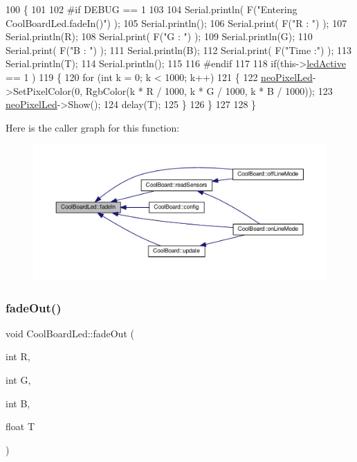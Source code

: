 \begin{DoxyCode}
100 \{
101 
102 \textcolor{preprocessor}{#if DEBUG == 1}
103 
104     Serial.println( F(\textcolor{stringliteral}{"Entering CoolBoardLed.fadeIn()"}) );
105     Serial.println();
106     Serial.print( F(\textcolor{stringliteral}{"R : "}) );
107     Serial.println(R);
108     Serial.print( F(\textcolor{stringliteral}{"G : "}) );
109     Serial.println(G);
110     Serial.print( F(\textcolor{stringliteral}{"B : "}) );
111     Serial.println(B);
112     Serial.print( F(\textcolor{stringliteral}{"Time :"}) );
113     Serial.println(T);
114     Serial.println();
115 
116 \textcolor{preprocessor}{#endif  }
117     
118     \textcolor{keywordflow}{if}(this->\hyperlink{class_cool_board_led_aadd04d2ecf123247718d77f42fba7f08}{ledActive} == 1 )
119     \{
120         \textcolor{keywordflow}{for} (\textcolor{keywordtype}{int} k = 0; k < 1000; k++) 
121         \{
122             \hyperlink{class_cool_board_led_ac2c13fa462a010cd9242bf297c013923}{neoPixelLed}->SetPixelColor(0, RgbColor(k * R / 1000, k * G / 1000, k * B / 1000));
123             \hyperlink{class_cool_board_led_ac2c13fa462a010cd9242bf297c013923}{neoPixelLed}->Show();
124             delay(T);
125         \}
126     \}
127 
128 \}
\end{DoxyCode}
Here is the caller graph for this function\+:\nopagebreak
\begin{figure}[H]
\begin{center}
\leavevmode
\includegraphics[width=350pt]{de/dc0/class_cool_board_led_ab778f5e7bed0ab74e3906d82110493c3_icgraph}
\end{center}
\end{figure}
\mbox{\label{class_cool_board_led_a93d545679237e8cc858324367149775c}} 
\subsubsection{\texorpdfstring{fade\+Out()}{fadeOut()}}
{\footnotesize\ttfamily void Cool\+Board\+Led\+::fade\+Out (\begin{DoxyParamCaption}\item[{int}]{R,  }\item[{int}]{G,  }\item[{int}]{B,  }\item[{float}]{T }\end{DoxyParamCaption})}

